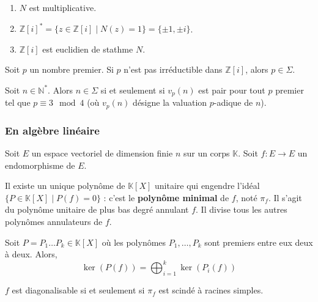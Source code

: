 	\begin{lemma}
		\begin{enumerate}[label=(\roman*)]
			\item $N$ est multiplicative.
			\item $\mathbb{Z}[i]^* = \{ z \in \mathbb{Z}[i] \mid N(z) = 1 \} = \{ \pm 1, \pm i \}$.
			\item $\mathbb{Z}[i]$ est euclidien de stathme $N$.
		\end{enumerate}
	\end{lemma}

	\begin{lemma}
		Soit $p$ un nombre premier. Si $p$ n'est pas irréductible dans $\mathbb{Z}[i]$, alors $p \in \Sigma$.
	\end{lemma}


	\begin{theorem}
		Soit $n \in \mathbb{N}^*$. Alors $n \in \Sigma$ si et seulement si $v_p(n)$ est pair pour tout $p$ premier tel que $p \equiv 3 \mod 4$ (où $v_p(n)$ désigne la valuation $p$-adique de $n$).
	\end{theorem}

	\subsubsection{En algèbre linéaire}

	Soit $E$ un espace vectoriel de dimension finie $n$ sur un corps $\mathbb{K}$. Soit $f : E \rightarrow E$ un endomorphisme de $E$.


	\begin{application}
		Il existe un unique polynôme de $\mathbb{K}[X]$ unitaire qui engendre l'idéal $\{ P \in \mathbb{K}[X] \mid P(f) = 0 \}$ : c'est le \textbf{polynôme minimal} de $f$, noté $\pi_f$. Il s'agit du polynôme unitaire de plus bas degré annulant $f$. Il divise tous les autres polynômes annulateurs de $f$.
	\end{application}


	\begin{theorem}
		Soit $P = P_1 \dots P_k \in \mathbb{K}[X]$ où les polynômes $P_1, \dots, P_k$ sont premiers entre eux deux à deux. Alors,
		\[ \ker(P(f)) = \bigoplus_{i=1}^k \ker(P_i(f)) \]
	\end{theorem}

	\begin{application}
		$f$ est diagonalisable si et seulement si $\pi_f$ est scindé à racines simples.
	\end{application}

